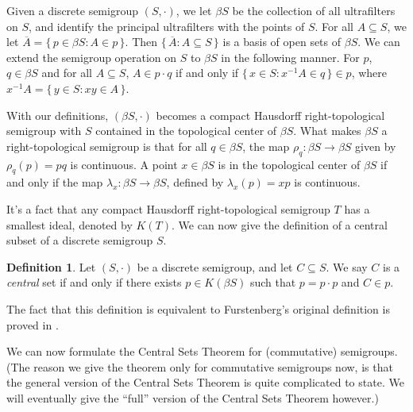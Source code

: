 \documentclass[12pt]{article}
\theoremstyle{plain}
\theoremstyle{definition}
\newtheorem{defn}[thm]{Definition}
\begin{document}
Given a discrete semigroup $(S, \cdot)$, we let $\beta S$ be the
collection of all ultrafilters on $S$, and identify the principal
ultrafilters with the points of $S$. 
For all $A \subseteq S$, we let $\overline{A} = \{\, p \in \beta S : A
\in p \,\}$. 
Then $\{\, \overline{A} : A \subseteq S \,\}$ is a basis of open sets
of $\beta S$. 
We can extend the semigroup operation on $S$ to $\beta S$ in the
following manner.
For $p$, $q \in \beta S$ and for all $A \subseteq S$, $A \in p \cdot
q$ if and only if $\{\, x \in S: x^{-1}A \in q \,\} \in p$, where
$x^{-1}A = \{\, y \in S : xy \in A \,\}$. 

With our definitions, $(\beta S, \cdot)$ becomes a compact Hausdorff
right-topological semigroup with $S$ contained in the topological
center of $\beta S$.
What makes $\beta S$ a right-topological semigroup is that for all $q
\in \beta S$, the map $\rho_q : \beta S \to \beta S$ given by
$\rho_q(p) = pq$ is continuous. 
A point $x \in \beta S$ is in the topological center of $\beta S$ if
and only if the map $\lambda_x : \beta S \to \beta S$, defined by
$\lambda_x(p) = xp$ is continuous.

It's a fact that any compact Hausdorff right-topological semigroup $T$ has
a smallest ideal, denoted by $K(T)$. 
We can now give the definition of a central subset of a discrete
semigroup $S$.

  \begin{defn}
    Let $(S, \cdot)$ be a discrete semigroup, and let $C \subseteq S$.
    We say $C$ is a \textsl{central} set if and only if there exists
    $p \in K(\beta S)$ such that $p = p \cdot p$ and $C \in p$.
  \end{defn}

The fact that this definition is equivalent to Furstenberg's original
definition is proved in \cite[Chapter 19, Section 3,
pages 404--407]{Hindman:1998fk}.

We can now formulate the Central Sets Theorem for (commutative)
semigroups.
(The reason we give the theorem only for commutative semigroups now,
is that the general version of the Central Sets Theorem is quite
complicated to state. 
We will eventually give the ``full'' version of the Central Sets
Theorem however.)
\end{document}
